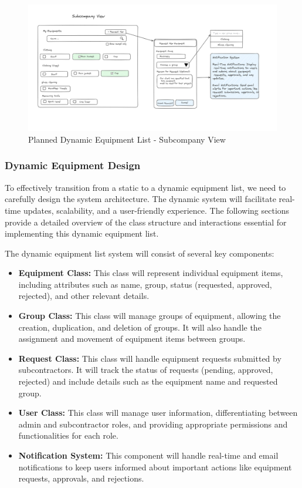 \begin{figure}[H]
    \centering
    \includegraphics[width=1\textwidth]{src/assets/chapters/DynamicEquipementSubcompany.PNG}
    \caption{Planned Dynamic Equipment List - Subcompany View}
    \label{fig:dynamic_equipment_list_subcompany}
\end{figure}
\subsubsection{Dynamic Equipment Design}
To effectively transition from a static to a dynamic equipment list, we need to carefully design the system architecture. The dynamic system will facilitate real-time updates, scalability, and a user-friendly experience. The following sections provide a detailed overview of the class structure and interactions essential for implementing this dynamic equipment list.

The dynamic equipment list system will consist of several key components:

\begin{itemize}
    \item \textbf{Equipment Class:} This class will represent individual equipment items, including attributes such as name, group, status (requested, approved, rejected), and other relevant details.
    \item \textbf{Group Class:} This class will manage groups of equipment, allowing the creation, duplication, and deletion of groups. It will also handle the assignment and movement of equipment items between groups.
    \item \textbf{Request Class:} This class will handle equipment requests submitted by subcontractors. It will track the status of requests (pending, approved, rejected) and include details such as the equipment name and requested group.
    \item \textbf{User Class:} This class will manage user information, differentiating between admin and subcontractor roles, and providing appropriate permissions and functionalities for each role.
    \item \textbf{Notification System:} This component will handle real-time and email notifications to keep users informed about important actions like equipment requests, approvals, and rejections.
\end{itemize}
